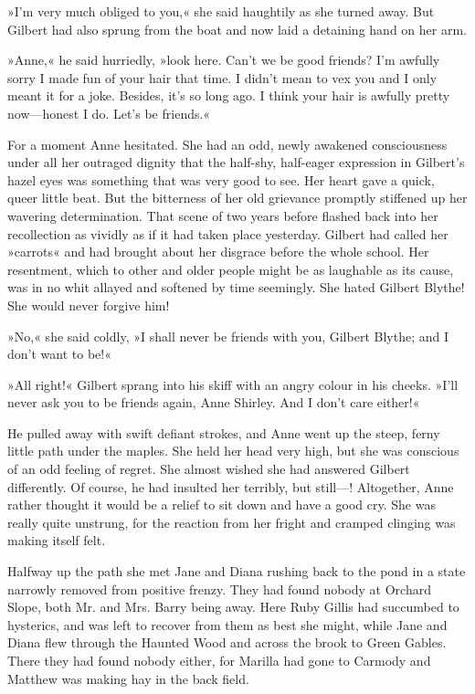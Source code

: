 »I'm very much obliged to you,« she said haughtily as she turned away. But Gilbert had also sprung from the boat and now laid a detaining hand on her arm.

»Anne,« he said hurriedly, »look here. Can't we be good friends? I'm awfully sorry I made fun of your hair that time. I didn't mean to vex you and I only meant it for a joke. Besides, it's so long ago. I think your hair is awfully pretty now—honest I do. Let's be friends.«

For a moment Anne hesitated. She had an odd, newly awakened consciousness under all her outraged dignity that the half-shy, half-eager expression in Gilbert's hazel eyes was something that was very good to see. Her heart gave a quick, queer little beat. But the bitterness of her old grievance promptly stiffened up her wavering determination. That scene of two years before flashed back into her recollection as vividly as if it had taken place yesterday. Gilbert had called her »carrots« and had brought about her disgrace before the whole school. Her resentment, which to other and older people might be as laughable as its cause, was in no whit allayed and softened by time seemingly. She hated Gilbert Blythe! She would never forgive him!

»No,« she said coldly, »I shall never be friends with you, Gilbert Blythe; and I don't want to be!«

»All right!« Gilbert sprang into his skiff with an angry colour in his cheeks. »I'll never ask you to be friends again, Anne Shirley. And I don't care either!«

He pulled away with swift defiant strokes, and Anne went up the steep, ferny little path under the maples. She held her head very high, but she was conscious of an odd feeling of regret. She almost wished she had answered Gilbert differently. Of course, he had insulted her terribly, but still—! Altogether, Anne rather thought it would be a relief to sit down and have a good cry. She was really quite unstrung, for the reaction from her fright and cramped clinging was making itself felt.

Halfway up the path she met Jane and Diana rushing back to the pond in a state narrowly removed from positive frenzy. They had found nobody at Orchard Slope, both Mr. and Mrs. Barry being away. Here Ruby Gillis had succumbed to hysterics, and was left to recover from them as best she might, while Jane and Diana flew through the Haunted Wood and across the brook to Green Gables. There they had found nobody either, for Marilla had gone to Carmody and Matthew was making hay in the back field.

